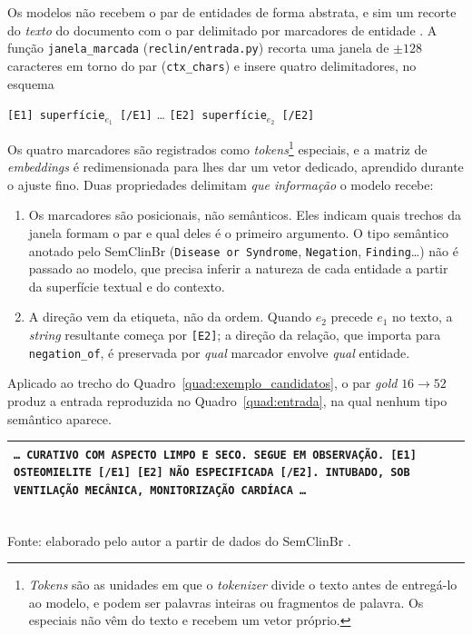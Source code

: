 Os modelos não recebem o par de entidades de forma abstrata, e sim um recorte do
\emph{texto} do documento com o par delimitado por marcadores de entidade
\cite{soares_2019_markers}. A função \texttt{janela\_marcada}
(\texttt{reclin/entrada.py}) recorta uma janela de $\pm 128$ caracteres em torno do
par (\texttt{ctx\_chars}) e insere quatro delimitadores, no esquema
%
\begin{center}
\texttt{[E1] superfície$_{e_1}$ [/E1]} \quad\dots\quad
\texttt{[E2] superfície$_{e_2}$ [/E2]}
\end{center}
%
Os quatro marcadores são registrados como \emph{tokens}\footnote{\emph{Tokens} são
as unidades em que o \emph{tokenizer} divide o texto antes de entregá-lo ao
modelo, e podem ser palavras inteiras ou fragmentos de palavra. Os especiais não
vêm do texto e recebem um vetor próprio.} especiais, e a matriz de \emph{embeddings}
é redimensionada para lhes dar um vetor dedicado, aprendido durante o ajuste fino.
Duas propriedades delimitam \emph{que informação} o modelo recebe:

\begin{enumerate}
  \item Os marcadores são posicionais, não semânticos. Eles indicam
        quais trechos da janela formam o par e qual deles é o primeiro
        argumento. O tipo semântico anotado pelo SemClinBr
        (\texttt{Disease or Syndrome}, \texttt{Negation}, \texttt{Finding}\ldots)
        não é passado ao modelo, que precisa inferir a natureza de cada
        entidade a partir da superfície textual e do contexto.
  \item A direção vem da etiqueta, não da ordem. Quando $e_2$ precede
        $e_1$ no texto, a \emph{string} resultante começa por \texttt{[E2]}; a
        direção da relação, que importa para \texttt{negation\_of}, é preservada por
        \emph{qual} marcador envolve \emph{qual} entidade.
\end{enumerate}

Aplicado ao trecho do Quadro~\ref{quad:exemplo_candidatos}, o par \emph{gold}
$16 \rightarrow 52$ produz a entrada reproduzida no Quadro~\ref{quad:entrada}, na
qual nenhum tipo semântico aparece.

\begin{quadro}[htbp]
  \centering
  \caption{Entrada efetivamente construída para o par \emph{gold} do Quadro~\ref{quad:exemplo_candidatos}.}
  \label{quad:entrada}
  \begin{tabular}{p{}}
  \toprule
  \texttt{\ldots{} CURATIVO COM ASPECTO LIMPO E SECO. SEGUE EM OBSERVAÇÃO.
  [E1] OSTEOMIELITE [/E1] [E2] NÃO ESPECIFICADA [/E2]. INTUBADO, SOB VENTILAÇÃO
  MECÂNICA, MONITORIZAÇÃO CARDÍACA \ldots} \\
  \bottomrule
  \end{tabular}\\[4pt]
  {\footnotesize Fonte: elaborado pelo autor a partir de dados do SemClinBr \cite{oliveira_2022_semclinbr}.}
\end{quadro}

